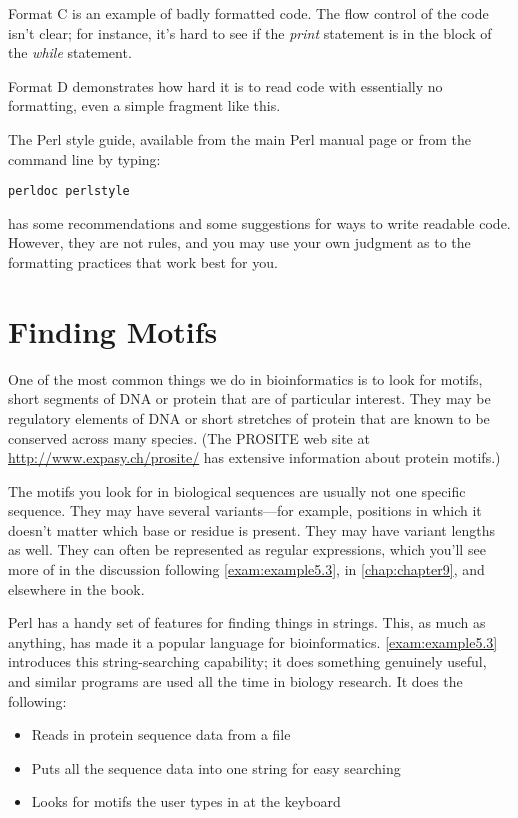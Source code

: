 Format C is an example of badly formatted code. The flow control of the code isn't clear; for instance, it's hard to see if the \textit{print} statement is in the block of the \textit{while} statement.  

Format D demonstrates how hard it is to read code with essentially no formatting, even a simple fragment like this.

The Perl style guide, available from the main Perl manual page or from the command line by typing:

\begin{lstlisting}
perldoc perlstyle
\end{lstlisting}

has some recommendations and some suggestions for ways to write readable code. However, they are not rules, and you may use your own judgment as to the formatting practices that work best for you. 

\section{Finding Motifs}
One of the most common things we do in bioinformatics is to look for motifs, short segments of DNA or protein that are of particular interest. They may be regulatory elements of DNA or short stretches of protein that are known to be conserved across many species. (The PROSITE web site at \href{http://www.expasy.ch/prosite/}{http://www.expasy.ch/prosite/} has extensive information about protein motifs.)

The motifs you look for in biological sequences are usually not one specific sequence. They may have several variants—for example, positions in which it doesn't matter which base or residue is present. They may have variant lengths as well. They can often be represented as regular expressions, which you'll see more of in the discussion following \autoref{exam:example5.3}, in \autoref{chap:chapter9}, and elsewhere in the book.  

Perl has a handy set of features for finding things in strings. This, as much as anything, has made it a popular language for bioinformatics.  \autoref{exam:example5.3} introduces this string-searching capability; it does something genuinely useful, and similar programs are used all the time in biology research. It does the following:

\begin{itemize}
  \item Reads in protein sequence data from a file
  \item Puts all the sequence data into one string for easy searching
  \item Looks for motifs the user types in at the keyboard
\end{itemize}

